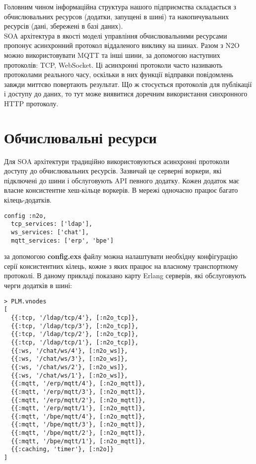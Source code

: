 Головним чином інформаційна структура нашого підприємства
складається з обчислювальних ресурсов (додатки, запущені в шині)
та накопичувальних ресурсів (дані, збережені в базі даних).
\
\\
SOA архітектура в якості моделі управління обчислювальними
ресурсами пропонує асинхронний протокол віддаленого виклику на шинах.
Разом з N2O можно використовувати MQTT та інші шини, за допомогою наступних протоколів: TCP, WebSocket.
Ці асинхронні протоколи часто називають
протоколами реального часу, оскільки в них функції відправки повідомлень завжди
миттєво повертають результат. Що ж стосується протоколів для публікації і доступу
до даних, то тут може виявитися доречним використання синхронного HTTP протоколу.

\newpage
\section{Обчислювальні ресурси}

Для SOA архітектури традиційно використовуються асинхронні
протоколи доступу до обчислювальних ресурсів. Зазвичай це серверні
воркери, які підключені до шини і обслуговують API певного додатку.
Кожен додаток має власне консистентне хеш-кільце воркерів. В мережі
одночасно працює багато кілець-додатків.

\begin{lstlisting}
config :n2o,
  tcp_services: ['ldap'],
  ws_services: ['chat'],
  mqtt_services: ['erp', 'bpe']
   \end{lstlisting}

за допомогою {\bf config.exs} файлу можна налаштувати необхідну
конфігурацію серії консистентних кілець, кожне з яких працює
на власному транспортному протоколі. В даному прикладі показано
карту Erlang серверів, які обслуговують черги додатків в шині:

\begin{lstlisting}
> PLM.vnodes
[
  {{:tcp, '/ldap/tcp/4'}, [:n2o_tcp]},
  {{:tcp, '/ldap/tcp/3'}, [:n2o_tcp]},
  {{:tcp, '/ldap/tcp/2'}, [:n2o_tcp]},
  {{:tcp, '/ldap/tcp/1'}, [:n2o_tcp]},
  {{:ws, '/chat/ws/4'}, [:n2o_ws]},
  {{:ws, '/chat/ws/3'}, [:n2o_ws]},
  {{:ws, '/chat/ws/2'}, [:n2o_ws]},
  {{:ws, '/chat/ws/1'}, [:n2o_ws]},
  {{:mqtt, '/erp/mqtt/4'}, [:n2o_mqtt]},
  {{:mqtt, '/erp/mqtt/3'}, [:n2o_mqtt]},
  {{:mqtt, '/erp/mqtt/2'}, [:n2o_mqtt]},
  {{:mqtt, '/erp/mqtt/1'}, [:n2o_mqtt]},
  {{:mqtt, '/bpe/mqtt/4'}, [:n2o_mqtt]},
  {{:mqtt, '/bpe/mqtt/3'}, [:n2o_mqtt]},
  {{:mqtt, '/bpe/mqtt/2'}, [:n2o_mqtt]},
  {{:mqtt, '/bpe/mqtt/1'}, [:n2o_mqtt]},
  {{:caching, 'timer'}, [:n2o]}
]
\end{lstlisting}

